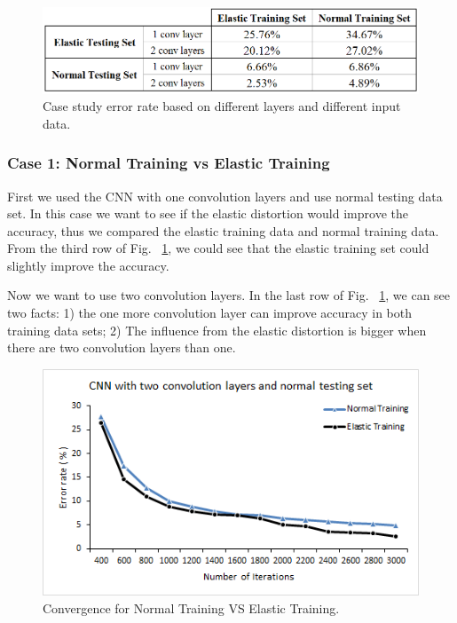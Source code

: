 \begin {figure}[t]
\centering
\includegraphics[width=0.90\columnwidth]{ResultsTbl1.png} %
\caption{Case study error rate based on different layers and different input data.}
\label{Case study error rate based on different layers and different input data}
\end {figure}



\subsubsection*{Case 1: Normal Training vs Elastic Training} 

First we used the CNN with one convolution layers and use normal testing data set. In this case
we want to see if the elastic distortion would improve the accuracy, thus we compared the elastic training data and normal training data. From the third row of Fig. ~\ref{Case study error rate based on different layers and different input data}, we could see that the elastic training set could slightly improve the accuracy.

Now we want to use two convolution layers. In the last row of Fig. ~\ref{Case study error rate based on different layers and different input data}, we can see two facts: 1) the one more convolution layer can improve accuracy in both training data sets; 2) The influence from the elastic distortion is bigger when there are two convolution layers than one.

\begin {figure}[t]
\centering
\includegraphics[width=0.9\columnwidth]{Paper_Fig7_Conv_Case1.png} %
\caption{Convergence for Normal Training VS Elastic Training.}
\label{Convergence plot in case 1}
\end {figure}



